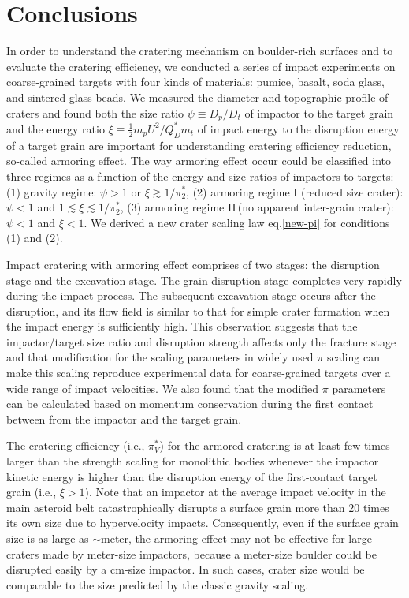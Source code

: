 \documentclass[3p,authoryear]{elsarticle}
\newcommand{\II}{I\hspace{-.1 em}I}
\begin{document}
 \section{Conclusions}\label{sec:conclusion}
In order to understand the cratering mechanism on boulder-rich surfaces and to evaluate the cratering efficiency, we conducted a series of impact experiments on coarse-grained targets with four kinds of materials: pumice, basalt, soda glass, and sintered-glass-beads.
We measured the diameter and topographic profile of craters and found both the size ratio $\psi\equiv D_p/D_t$ of impactor to the target grain and the energy ratio $\xi\equiv \frac{1}{2}m_pU^2/Q_D^*m_t$ of impact energy to the disruption energy of a target grain are important for understanding cratering efficiency reduction, so-called armoring effect.
The way armoring effect occur could be classified into three regimes as a function of the energy and size ratios of impactors to targets: (1) gravity regime: $\psi>1$ or $\xi\gtrsim 1/\pi_2^*$, (2) armoring regime I (reduced size crater): $\psi<1$ and $1\lesssim\xi \lesssim1/\pi_2^*$, (3) armoring regime \II\,(no apparent inter-grain crater): $\psi<1$ and $\xi<1$.
We derived a new crater scaling law eq.\eqref{new-pi} for conditions (1) and (2).

Impact cratering with armoring effect comprises of two stages: the disruption stage and the excavation stage.
The grain disruption stage completes very rapidly during the impact process.
The subsequent excavation stage occurs after the disruption, and its flow field is similar to that for simple crater formation when the impact energy is sufficiently high.
This observation suggests that the impactor/target size ratio and disruption strength affects only the fracture stage and that modification for the scaling parameters in widely used $\pi$ scaling \citep[e.g.,][]{holsapple1993} can make this scaling reproduce experimental data for coarse-grained targets over a wide range of impact velocities.
We also found that the modified $\pi$ parameters can be calculated based on momentum conservation during the first contact between from the impactor and the target grain.

The cratering efficiency (i.e., $\pi_V^*$) for the armored cratering is at least few times larger than the strength scaling for monolithic bodies whenever the impactor kinetic energy is higher than the disruption energy of the first-contact target grain (i.e., $\xi>1$). Note that an impactor at the average impact velocity in the main asteroid belt catastrophically disrupts a surface grain more than 20 times its own size due to hypervelocity impacts. Consequently, even if the surface grain size is as large as $\sim$meter, the armoring effect may not be effective for large craters made by meter-size impactors, because a meter-size boulder could be disrupted easily by a cm-size impactor. In such cases, crater size would be comparable to the size predicted by the classic gravity scaling.
\end{document}
